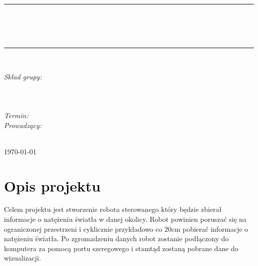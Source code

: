 \documentclass[10pt, a4paper]{article}
\begin{document}
\def\tablename{Tabela}	%

\begin{titlepage}
	\begin{center}
		\textsc{\LARGE \formakursu}\\[1cm]		
		\textsc{\Large \kurs}\\[0.5cm]		
		\rule{\textwidth}{0.08cm}\\[0.4cm]
		{\huge \bfseries \doctype}\\[1cm]
		{\huge \bfseries \projectname}\\[0.5cm]
		\rule{\textwidth}{0.08cm}\\[1cm]
		
		\begin{flushright} \large
		\emph{Skład grupy:}\\
		\osobaA\\
		\osobaB\\
		\osobaC\\[0.4cm]
		
		\emph{Termin: }\termin\\[0.4cm]

		\emph{Prowadzący:} \\
		\prowadzacy \\
		
		\end{flushright}
		
		\vfill
		
		{\large \today}
	\end{center}	
\end{titlepage}

\newpage
\tableofcontents
\newpage

\section{Opis projektu}
Celem projektu jest stworzenie robota sterowanego który będzie zbierał informacje o natężeniu światła w danej okolicy. Robot powinien poruszać się na ograniczonej przestrzeni i cyklicznie przykładowo co 20cm pobierać informacje o natężeniu światła. Po zgromadzeniu danych robot zostanie podłączony do komputera za pomocą portu szeregowego i stamtąd zostaną pobrane dane do wizualizacji.
\end{document}
